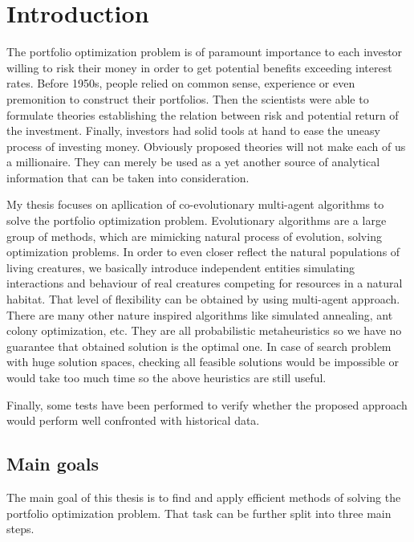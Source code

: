 \chapter{Introduction}
\label{cha:introduction}

The portfolio optimization problem is of paramount importance to each investor willing to risk their money in order to get potential benefits exceeding interest rates.
Before 1950s, people relied on common sense, experience or even premonition to construct their portfolios.
Then the scientists were able to formulate theories establishing the relation between risk and potential return of the investment.
Finally, investors had solid tools at hand to ease the uneasy process of investing money.
Obviously proposed theories will not make each of us a millionaire.
They can merely be used as a yet another source of analytical information that can be taken into consideration.

My thesis focuses on apllication of co-evolutionary multi-agent algorithms to solve the portfolio optimization problem.
Evolutionary algorithms are a large group of methods, which are mimicking natural process of evolution, solving optimization problems.
In order to even closer reflect the natural populations of living creatures, we basically introduce independent entities simulating interactions and behaviour of real creatures
competing for resources in a natural habitat.
That level of flexibility can be obtained by using multi-agent approach.
There are many other nature inspired algorithms like simulated annealing, ant colony optimization, etc.
They are all probabilistic metaheuristics so we have no guarantee that obtained solution is the optimal one.
In case of search problem with huge solution spaces, checking all feasible solutions would be impossible or would take too much time so the above heuristics are
 still useful.

   
Finally, some tests have been performed to verify whether the proposed approach would perform well confronted with historical data. 
     



\section{Main goals}
\label{sec:mainGoals}

The main goal of this thesis is to find and apply efficient methods of solving the portfolio optimization problem. That task can be further split into three main steps.

